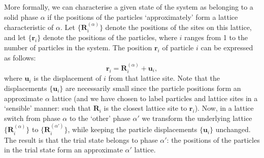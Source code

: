 \documentclass{report}
\begin{document}
More formally, we can characterise a given state of the system as belonging to a solid phase $\alpha$ if the positions of the particles 
`approximately' form a lattice characteristic of $\alpha$. Let $\lbrace\mathbf{R}^{(\alpha)}_i\rbrace$ denote the positions of the sites on this lattice, 
and let $\lbrace\mathbf{r}_i\rbrace$ denote the positions of the particles, where $i$ ranges from 1 to the number of particles in the system. 
The position $\mathbf{r}_i$ of particle $i$ can be expressed as follows:
\begin{equation}
\mathbf{r}_i=\mathbf{R}^{(\alpha)}_i+\mathbf{u}_i,
\end{equation}
where $\mathbf{u}_i$ is the displacement of $i$ from that lattice site. Note that the displacements $\lbrace\mathbf{u}_i\rbrace$ are necessarily small 
since the particle positions form an approximate $\alpha$ lattice (and we have chosen to label particles and lattice sites in a `sensible' manner: such 
that $\mathbf{R}_i$ is the closest lattice site to $\mathbf{r}_i$). Now, in a lattice switch from phase $\alpha$ to the `other' phase $\alpha'$ we 
transform the underlying lattice $\lbrace\mathbf{R}^{(\alpha)}_i\rbrace$ to $\lbrace\mathbf{R}^{(\alpha')}_i\rbrace$, 
while keeping the particle displacements $\lbrace\mathbf{u}_i\rbrace$ unchanged. The result is that the trial state belongs to phase 
$\alpha'$: the positions of the particles in the trial state form an approximate $\alpha'$ lattice.
\end{document}
